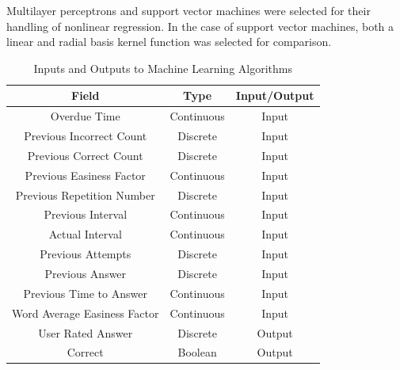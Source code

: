Multilayer perceptrons and support vector machines were selected for their
handling of nonlinear regression. In the case of support vector machines, both
a linear and radial basis kernel function was selected for comparison.

\begin{table}[h!]
\caption{Inputs and Outputs to Machine Learning Algorithms}
\label{tbl_inputoutputs}
\begin{tabular}{|c|c|c|}
\hline
Field & Type & Input/Output \\
\hline
Overdue Time & Continuous & Input \\
Previous Incorrect Count & Discrete & Input \\
Previous Correct Count & Discrete & Input \\
Previous Easiness Factor & Continuous & Input \\
Previous Repetition Number & Discrete & Input \\
Previous Interval & Continuous & Input \\
Actual Interval & Continuous & Input \\
Previous Attempts & Discrete & Input \\
Previous Answer & Discrete & Input \\
Previous Time to Answer & Continuous & Input \\
Word Average Easiness Factor & Continuous & Input \\
\hline
User Rated Answer & Discrete & Output \\
Correct & Boolean & Output \\
\hline
\end{tabular}
\end{table}